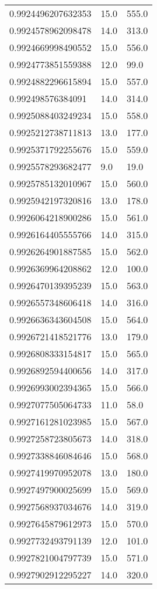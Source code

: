 \begin{center}
\begin{supertabular}[H]{p{0.30\textwidth}p{0.05\textwidth}p{0.05\textwidth}}
0.9924496207632353 & 15.0 & 555.0 \\ 
0.9924578962098478 & 14.0 & 313.0 \\ 
0.9924669998490552 & 15.0 & 556.0 \\ 
0.9924773851559388 & 12.0 & 99.0 \\ 
0.9924882296615894 & 15.0 & 557.0 \\ 
0.992498576384091 & 14.0 & 314.0 \\ 
0.9925088403249234 & 15.0 & 558.0 \\ 
0.9925212738711813 & 13.0 & 177.0 \\ 
0.9925371792255676 & 15.0 & 559.0 \\ 
0.9925578293682477 & 9.0 & 19.0 \\ 
0.9925785132010967 & 15.0 & 560.0 \\ 
0.9925942197320816 & 13.0 & 178.0 \\ 
0.9926064218900286 & 15.0 & 561.0 \\ 
0.9926164405555766 & 14.0 & 315.0 \\ 
0.9926264901887585 & 15.0 & 562.0 \\ 
0.9926369964208862 & 12.0 & 100.0 \\ 
0.9926470139395239 & 15.0 & 563.0 \\ 
0.9926557348606418 & 14.0 & 316.0 \\ 
0.9926636343604508 & 15.0 & 564.0 \\ 
0.9926721418521776 & 13.0 & 179.0 \\ 
0.9926808333154817 & 15.0 & 565.0 \\ 
0.9926892594400656 & 14.0 & 317.0 \\ 
0.9926993002394365 & 15.0 & 566.0 \\ 
0.9927077505064733 & 11.0 & 58.0 \\ 
0.9927161281023985 & 15.0 & 567.0 \\ 
0.9927258723805673 & 14.0 & 318.0 \\ 
0.9927338846084646 & 15.0 & 568.0 \\ 
0.9927419970952078 & 13.0 & 180.0 \\ 
0.9927497900025699 & 15.0 & 569.0 \\ 
0.9927568937034676 & 14.0 & 319.0 \\ 
0.9927645879612973 & 15.0 & 570.0 \\ 
0.9927732493791139 & 12.0 & 101.0 \\ 
0.9927821004797739 & 15.0 & 571.0 \\ 
0.9927902912295227 & 14.0 & 320.0 \\ 

\end{supertabular}
\end{center}
